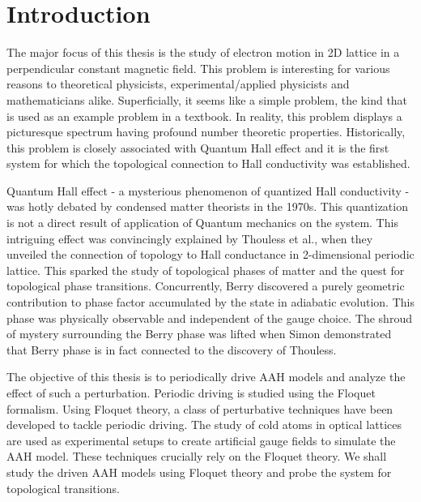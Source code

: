 %

\chapter{Introduction}
The major focus of this thesis is the study of electron motion in 2D lattice in a perpendicular constant magnetic field. This problem is interesting for various reasons to
theoretical physicists, experimental/applied physicists and mathematicians alike. Superficially, it seems like a simple problem, the kind that is used as an example problem in a textbook. In reality,
this problem displays a picturesque spectrum having profound number theoretic properties. Historically, this problem is closely associated with Quantum Hall effect and it is the first system
for which the topological connection to Hall conductivity was established.

Quantum Hall effect - a mysterious phenomenon of quantized Hall conductivity - was hotly debated by condensed matter theorists in the 1970s. This quantization is not a direct
result of application of Quantum mechanics on the system. This intriguing effect was convincingly explained by Thouless et al., when they unveiled the connection of topology to
Hall conductance in 2-dimensional periodic lattice. This sparked the study of topological phases of matter and the quest for topological phase transitions. Concurrently, Berry
discovered a purely geometric contribution to phase factor accumulated by the state in adiabatic evolution. This phase was physically observable and independent of the gauge choice.
The shroud of mystery surrounding the Berry phase was lifted when Simon demonstrated that Berry phase is in fact connected to the discovery of Thouless. 

The objective of this thesis is to periodically drive AAH models and analyze the effect of such a perturbation. Periodic driving is studied using the Floquet formalism.
Using Floquet theory, a class of perturbative techniques have been developed to tackle periodic driving. The study of cold atoms in optical lattices are used as experimental
setups to create artificial gauge fields to simulate the AAH model. These techniques crucially rely on the Floquet theory. We shall study the driven AAH models using Floquet
theory and probe the system for topological transitions.

